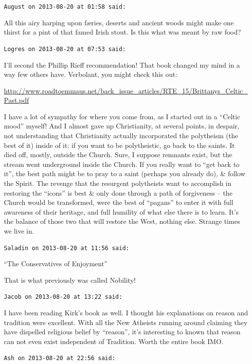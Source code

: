 \begin{footnotesize}
\begin{sffamily}
\texttt{August on 2013-08-20 at 01:58 said:}

All this airy harping upon færies, deserts and ancient woods might make one thirst for a pint of that famed Irish stout. Is this what was meant by raw food?

\hfill

\texttt{Logres on 2013-08-20 at 07:53 said:}

I'll second the Phillip Rieff recommendation! That book changed my mind in a way few others have. Verbolant, you might check this out:

\url{http://www.roadtoemmaus.net/back\_issue\_articles/RTE\_15/Brittanys\_Celtic\_Past.pdf}

I have a lot of sympathy for where you come from, as I started out in a ``Celtic mood'' myself! And I almost gave up Christianity, at several points, in despair, not understanding that Christianity actually incorporated the polytheism (the best of it) inside of it: if you want to be polytheistic, go back to the saints. It died off, mostly, outside the Church. Sure, I suppose remnants exist, but the stream went underground inside the Church. If you really want to ``get back to it'', the best path might be to pray to a saint (perhaps you already do), \& follow the Spirit. The revenge that the resurgent polytheists want to accomplish in restoring the ``icons'' is best \& only done through a path of forgiveness -- the Church would be transformed, were the best of ``pagans'' to enter it with full awareness of their heritage, and full humility of what else there is to learn. It's the balance of those two that will restore the West, nothing else. Strange times we live in.

\hfill

\texttt{Saladin on 2013-08-20 at 11:56 said:}

``The Conservatives of Enjoyment''

That is what previously was called Nobility!

\hfill

\texttt{Jacob on 2013-08-20 at 13:22 said:}

I have been reading Kirk's book as well. I thought his explanations on reason and tradition were excellent. With all the New Atheists running around claiming they have dispelled religious belief by ``reason'', it's interesting to known that reason can not even exist independent of Tradition. Worth the entire book IMO.

\hfill

\texttt{Ash on 2013-08-20 at 22:56 said:}


\end{sffamily}
\end{footnotesize}
